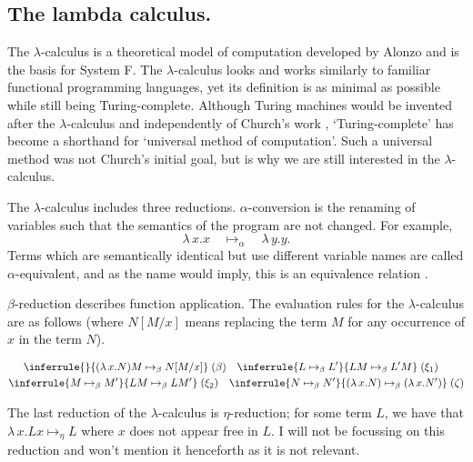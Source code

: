 \subsection{The lambda calculus.}
The $\lambda$-calculus is a theoretical model of computation developed by Alonzo
\citet{church_set_1932} and is the basis for System F. The $\lambda$-calculus looks and works
similarly to familiar functional programming languages, yet its definition is as minimal as possible
while still being Turing-complete. Although Turing machines would be invented after the
$\lambda$-calculus and independently of Church's work \citep{turing_computable_1937},
`Turing-complete' has become a shorthand for `universal method of computation'. Such a universal
method was not Church's initial goal, but is why we are still interested in the $\lambda$-calculus.

The $\lambda$-calculus includes three reductions. $\alpha$-conversion is the renaming of variables
such that the semantics of the program are not changed. For example,
\begin{equation*}
  \lambda \, x. x \quad \mapsto_{\alpha} \quad \lambda \, y. y.
\end{equation*}
Terms which are semantically identical but use different variable names are called
$\alpha$-equivalent, and as the name would imply, this is an equivalence relation
\citep{pierce_types_2002}.

$\beta$-reduction describes function application. The evaluation rules for the $\lambda$-calculus
are as follows \citep{wadler_programming_2022} (where $N[M/x]$ means replacing the term $M$ for any
occurrence of $x$ in the term $N$).

\begin{equation}
\label{equation:untyped_beta_rules}
\begin{gathered}
  \inferrule{ }{(\lambda \, x. N)M \mapsto_{\beta} N[M/x]} \; (\beta) \quad
  \inferrule{L \mapsto_{\beta} L'}{LM \mapsto_{\beta} L'M} \; (\xi_1) \quad\\
  \inferrule{M \mapsto_{\beta} M'}{LM \mapsto_{\beta} LM'} \; (\xi_2) \quad
  \inferrule
    {N \mapsto_{\beta} N'}
    {(\lambda \, x. N) \mapsto_{\beta} (\lambda \, x. N')} \; (\zeta)
\end{gathered}
\end{equation}

The last reduction of the $\lambda$-calculus is $\eta$-reduction; for some term $L$, we have that
$\lambda \, x. L x \mapsto_{\eta} L$ where $x$ does not appear free in $L$. I will not be focussing
on this reduction and won't mention it henceforth as it is not relevant.

